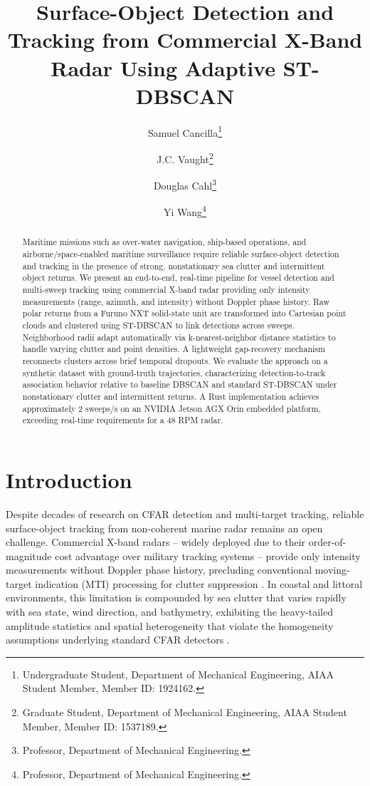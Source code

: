 \documentclass[conf]{new-aiaa}
\title{Surface-Object Detection and Tracking from Commercial X-Band Radar Using Adaptive ST-DBSCAN}
\author{Samuel Cancilla\footnote{Undergraduate Student, Department of Mechanical Engineering, AIAA Student Member, Member ID: 1924162.}}
\author{J.C. Vaught\footnote{Graduate Student, Department of Mechanical Engineering, AIAA Student Member, Member ID: 1537189.}}
\author{Douglas Cahl\footnote{Professor, Department of Mechanical Engineering.}}
\author{Yi Wang\footnote{Professor, Department of Mechanical Engineering.}}
\affil{University of South Carolina, Columbia, SC, 29208}
\begin{document}
\maketitle

\begin{abstract}
\noindent Maritime missions such as over-water navigation, ship-based operations, and airborne/space-enabled maritime surveillance require reliable surface-object detection and tracking in the presence of strong, nonstationary sea clutter and intermittent object returns. We present an end-to-end, real-time pipeline for vessel detection and multi-sweep tracking using commercial X-band radar providing only intensity measurements (range, azimuth, and intensity) without Doppler phase history. Raw polar returns from a Furuno NXT solid-state unit are transformed into Cartesian point clouds and clustered using ST-DBSCAN to link detections across sweeps. Neighborhood radii adapt automatically via k-nearest-neighbor distance statistics to handle varying clutter and point densities. A lightweight gap-recovery mechanism reconnects clusters across brief temporal dropouts. We evaluate the approach on a synthetic dataset with ground-truth trajectories, characterizing detection-to-track association behavior relative to baseline DBSCAN and standard ST-DBSCAN under nonstationary clutter and intermittent returns. A Rust implementation achieves approximately 2 sweeps/s on an NVIDIA Jetson AGX Orin embedded platform, exceeding real-time requirements for a 48 RPM radar.
\end{abstract}

\section{Introduction}

Despite decades of research on CFAR detection and multi-target tracking, reliable surface-object tracking from non-coherent marine radar remains an open challenge. Commercial X-band radars -- widely deployed due to their order-of-magnitude cost advantage over military tracking systems -- provide only intensity measurements without Doppler phase history, precluding conventional moving-target indication (MTI) processing for clutter suppression \cite{Brennan1973}. In coastal and littoral environments, this limitation is compounded by sea clutter that varies rapidly with sea state, wind direction, and bathymetry, exhibiting the heavy-tailed amplitude statistics and spatial heterogeneity that violate the homogeneity assumptions underlying standard CFAR detectors \cite{Ward1981}.
\end{document}

